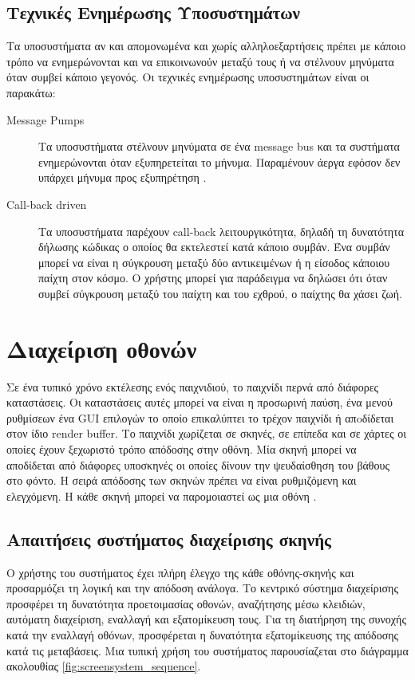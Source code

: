 	\subsection{Τεχνικές Ενημέρωσης Υποσυστημάτων}
	Τα υποσυστήματα αν και απομονωμένα και χωρίς αλληλοεξαρτήσεις πρέπει με κάποιο τρόπο να ενημερώνονται και να επικοινωνούν μεταξύ τους ή να στέλνουν μηνύματα όταν συμβεί κάποιο γεγονός. Οι τεχνικές ενημέρωσης υποσυστημάτων είναι οι παρακάτω:
	\begin{description}
	\item [Message Pumps] Τα υποσυστήματα στέλνουν μηνύματα σε ένα message bus και τα συστήματα ενημερώνονται όταν εξυπηρετείται το μήνυμα. Παραμένουν άεργα εφόσον δεν υπάρχει μήνυμα προς εξυπηρέτηση \cite{Erl:2009:SDP:1538586}.
	\item [Call-back driven] Tα υποσυστήματα παρέχουν call-back λειτουργικότητα, δηλαδή τη δυνατότητα δήλωσης κώδικας ο οποίος θα εκτελεστεί κατά κάποιο συμβάν. Ένα συμβάν μπορεί να είναι η σύγκρουση μεταξύ δύο αντικειμένων ή η είσοδος κάποιου παίχτη στον κόσμο. Ο χρήστης μπορεί για παράδειγμα να δηλώσει ότι όταν συμβεί σύγκρουση μεταξύ του παίχτη και του εχθρού, ο παίχτης θα χάσει ζωή.
	\end{description}
		
	\section{Διαχείριση οθονών}
	Σε ένα τυπικό χρόνο εκτέλεσης ενός παιχνιδιού, το παιχνίδι περνά από διάφορες καταστάσεις. Οι καταστάσεις αυτές μπορεί να είναι η προσωρινή παύση, ένα μενού ρυθμίσεων ένα \gls{GUI} επιλογών το οποίο επικαλύπτει το τρέχον παιχνίδι ή απoδίδεται στον ίδιο render buffer. Το παιχνίδι χωρίζεται σε σκηνές, σε επίπεδα και σε χάρτες οι οποίες έχουν ξεχωριστό τρόπο απόδοσης στην οθόνη. Μία σκηνή μπορεί να αποδίδεται από διάφορες υποσκηνές οι οποίες δίνουν την ψευδαίσθηση του βάθους στο φόντο. Η σειρά απόδοσης των σκηνών πρέπει να είναι ρυθμιζόμενη και ελεγχόμενη. Η κάθε σκηνή μπορεί να παρομοιαστεί ως μια οθόνη \cite{sanja14}.

	\subsection{Απαιτήσεις συστήματος διαχείρισης σκηνής}
	Ο χρήστης του συστήματος έχει πλήρη έλεγχο της κάθε οθόνης-σκηνής και προσαρμόζει τη λογική και την απόδοση ανάλογα. Το κεντρικό σύστημα διαχείρισης προσφέρει τη δυνατότητα προετοιμασίας οθονών, αναζήτησης μέσω κλειδιών, αυτόματη διαχείριση, εναλλαγή και εξατομίκευση τους. Για τη διατήρηση της συνοχής κατά την εναλλαγή οθόνων, προσφέρεται η δυνατότητα εξατομίκευσης της απόδοσης κατά τις μεταβάσεις. Μια τυπική χρήση του συστήματος παρουσίαζεται στο διάγραμμα ακολουθίας \ref{fig:screensystem_sequence}.


